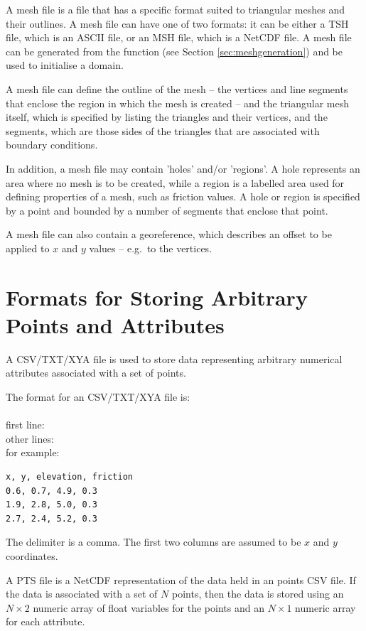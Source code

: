\documentclass{manual}
\begin{document}
A mesh file is a file that has a specific format suited to
triangular meshes and their outlines. A mesh file can have one of
two formats: it can be either a TSH file, which is an ASCII file, or
an MSH file, which is a NetCDF file. A mesh file can be generated
from the function  (see
Section \ref{sec:meshgeneration}) and be used to initialise a domain.

A mesh file can define the outline of the mesh -- the vertices and
line segments that enclose the region in which the mesh is
created -- and the triangular mesh itself, which is specified by
listing the triangles and their vertices, and the segments, which
are those sides of the triangles that are associated with boundary
conditions.

In addition, a mesh file may contain 'holes' and/or 'regions'. A
hole represents an area where no mesh is to be created, while a
region is a labelled area used for defining properties of a mesh,
such as friction values.  A hole or region is specified by a point
and bounded by a number of segments that enclose that point.

A mesh file can also contain a georeference, which describes an
offset to be applied to $x$ and $y$ values -- e.g.\ to the vertices.

\section{Formats for Storing Arbitrary Points and Attributes}

A CSV/TXT/XYA file is used to store data representing
arbitrary numerical attributes associated with a set of points.

The format for an CSV/TXT/XYA file is:\\
 \\
first line:   \\
other lines:  \code{[x value], [y value], [attributes]}\\

for example:

\begin{verbatim}
x, y, elevation, friction
0.6, 0.7, 4.9, 0.3
1.9, 2.8, 5.0, 0.3
2.7, 2.4, 5.2, 0.3
\end{verbatim}

The delimiter is a comma. The first two columns are assumed to
be $x$ and $y$ coordinates.

A PTS file is a NetCDF representation of the data held in an points CSV
file. If the data is associated with a set of $N$ points, then the
data is stored using an $N \times 2$ numeric array of float
variables for the points and an $N \times 1$ numeric array for each
attribute.
\end{document}
